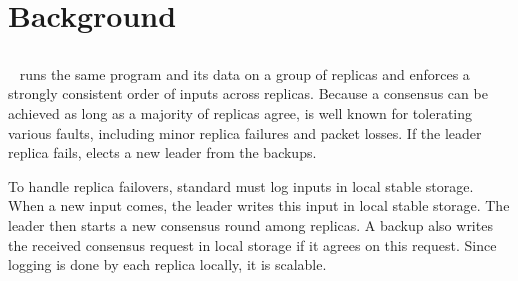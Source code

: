 \section{Background}\label{sec:background}


\subsection{\paxos}\label{sec:paxos}
\paxos~\cite{paxos:complex,paxos,paxos:simple,paxos:live,paxos:fast,
paxos:practical} runs the same program and its data on a group of replicas 
and enforces a strongly consistent order of inputs across replicas. Because 
a consensus can be achieved as long as a majority of replicas agree, \paxos is 
well known for tolerating various faults, including minor replica failures 
and packet losses. If the leader replica fails, \paxos elects a new leader from 
the backups.

To handle replica failovers, standard \paxos must log inputs in local 
stable storage. When a new input comes, the \paxos leader writes this input in 
local stable storage. The leader then starts a new consensus round among 
replicas. A backup also writes the received consensus request in local storage 
if it agrees on this request. Since logging is done by each replica locally, it 
is scalable.



